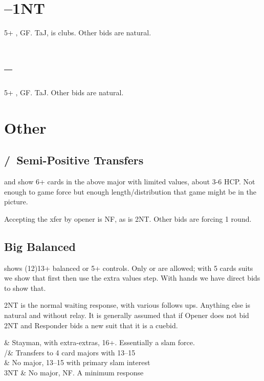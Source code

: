 \documentclass[tom-jenni]{subfile}
\begin{document}
	\section[1C--1NT]{--1NT}
	
	5+ \hhh, GF.  TaJ,  is clubs. Other bids are natural.
	
	\section[1C--2C]{--}
	
	5+ \ddd, GF.  TaJ. Other bids are natural.
	
	\section{Other}
	
	\subsection{/\hhh ~Semi-Positive Transfers}	
		 and  show 6+ cards in the above major with limited values, about 3-6 HCP.  Not enough to game force but enough length/distribution that game might be in the picture.
		
		Accepting the xfer by opener is NF, as is 2NT.  Other bids are forcing 1 round.
		
	\subsection{ Big Balanced}
	
	 shows (12)13+ balanced or 5+ controls.  Only  or  are allowed; with 5 cards suits we show that first then use the extra values step.  With  hands we have direct bids to show that.
		
	2NT is the normal waiting response, with various follows ups.  Anything else is natural and without relay.  It is generally assumed that if Opener does not bid 2NT and Responder bids a new suit that it is a cuebid.
	
	\begin{bidtable}{}
		 & Stayman, with extra-extras, 16+.  Essentially a slam force. \\
		/\hhh& Transfers to 4 card majors with 13--15 \\
		 & No major, 13--15 with primary slam interest \\
		3NT & No major, NF.  A minimum  response \\
	\end{bidtable}	
\end{document}
